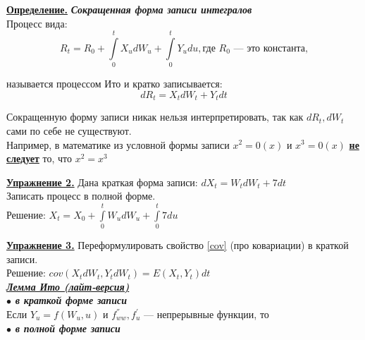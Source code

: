 \documentclass[a4paper]{article}
\begin{document}
 \newpage

 \par {\bf\underline{Определение.}} {\it\bf Сокращенная форма записи интегралов} \\

 Процесс вида: $$R_t=R_0+\int\limits_{0}^{t}X_udW_u+\int\limits_{0}^{t}Y_udu, \text{где $R_0$ --- это константа,}$$

 называется процессом Ито и кратко записывается:
 $$dR_t=X_tdW_t+Y_tdt$$

 Сокращенную форму записи никак нельзя интерпретировать, так как $dR_t, dW_t$ сами по себе не существуют.\\

 Например, в математике из условной формы записи $x^2=0(x)$ и $x^3=0(x)$ \underline{\bf не следует} то, что $x^2=x^3$\\

 \par {\bf\underline{Упражнение 2.}} Дана краткая форма записи: $dX_t=W_tdW_t+7dt$\\

 Записать процесс в полной форме.\\

 Решение: $X_t=X_0+\int\limits_{0}^{t}W_udW_u+\int\limits_{0}^{t}7du$\\

 \par {\bf\underline{Упражнение 3.}} Переформулировать свойство \ref{cov} (про ковариации) в краткой записи.\\

 Решение: $cov\left(X_tdW_t, Y_tdW_t\right)=E(X_t,Y_t)dt$\\

 {\large\it\bf \underline{Лемма Ито (лайт-версия)} \\

 $\bullet$ в краткой форме записи}\\

 Если $Y_u=f(W_u,u)$ и $f^{''}_{ww}, f^{'}_{u}$ --- непрерывные функции, то \\

 {\large\it\bf $\bullet$ в полной форме записи}\\

 \\ \\
\end{document}
